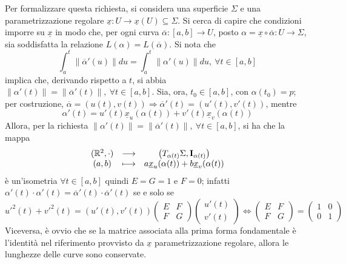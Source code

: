\documentclass[12pt]{scrartcl}
\theoremstyle{style}
\numberwithin{equation}{subsection}
\begin{document}
Per formalizzare questa richiesta, si considera una superficie $\Sigma$ e una parametrizzazione regolare $\underline{x}: U \to \underline{x}(U) \subseteq \Sigma$.
Si cerca di capire che condizioni imporre su $\underline{x}$ in modo che, per ogni curva $\overline{\alpha }:[a,b] \to U$, posto $\alpha  = \underline{x}\circ \overline{\alpha } : U \to \Sigma$, sia soddisfatta la relazione $L(\alpha ) = L(\overline{\alpha })$.
Si nota che
\[
	\int_{a} ^t \left\lVert \overline{\alpha }'(u) \right\rVert du = \int_{a} ^t \left\lVert \alpha '(u) \right\rVert du,\ \forall t \in [a,b]
\] 
implica che, derivando rispetto a $t$, si abbia $\left\lVert \alpha '(t) \right\rVert =\left\lVert \overline{\alpha }'(t) \right\rVert , \ \forall t \in [a,b]$.
Sia, ora, $t_0 \in [a,b]$, con $\alpha (t_0) = p$; per costruzione, $\overline{\alpha } = (u(t),v(t))\Rightarrow \overline{\alpha }'(t) = (u'(t),v'(t))$, mentre
\[
\alpha '(t) = u'(t) \underline{x}_u(\alpha (t)) + v'(t) \underline{x}_v(\alpha (t))
\] 
Allora, per la richiesta $\left\lVert \alpha '(t) \right\rVert =\left\lVert \overline{\alpha }'(t) \right\rVert , \ \forall t \in [a,b]$, si ha che la mappa 
\[
\begin{array}
	{c c c}
	(\mathbb{R}^2, \cdot )&\longrightarrow &\big(T_{\alpha (t)} \Sigma, \mathbf{I} _{\alpha (t)} \big)\\
	(a,b)  & \longmapsto & a \underline{x}_u (\alpha (t)) + b \underline{x}_v (\alpha (t))
\end{array}
\] 
\`e un'isometria $\forall t \in [a,b]$ quindi $E = G = 1$ e $F = 0$; infatti $\alpha ' (t)\cdot \alpha '(t) = \overline{\alpha }'(t) \cdot \overline{\alpha }'(t)$ se e solo se
\[
	u'^2(t) + v'^2(t) = (u'(t) , v'(t)) \begin{pmatrix} E & F \\ F &  G \end{pmatrix} \begin{pmatrix} u'(t) \\ v'(t) \end{pmatrix} \iff \begin{pmatrix} E & F \\ F & G \end{pmatrix} = \begin{pmatrix} 1 & 0 \\ 0 & 1 \end{pmatrix} 
\] 
Viceversa, \`e ovvio che se la matrice associata alla prima forma fondamentale \`e l'identit\`a nel riferimento provvisto da $\underline{x}$ parametrizzazione regolare, allora le lunghezze delle curve sono conservate.
\end{document}
